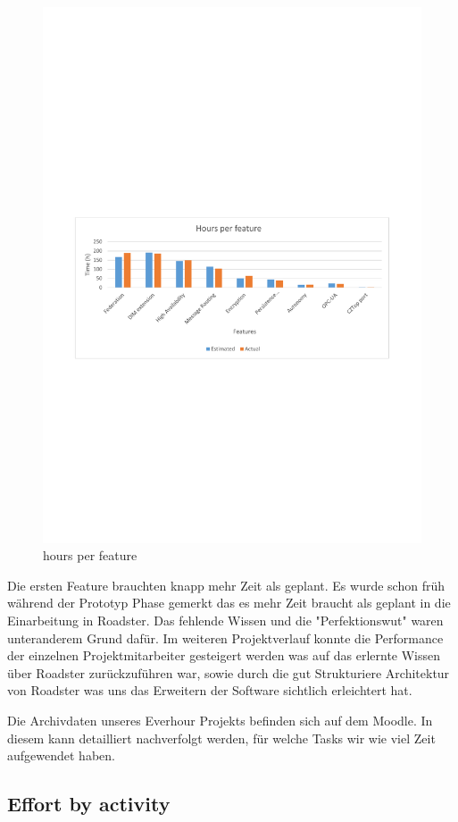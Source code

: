 
\begin{figure}[]
	\includegraphics[trim=2cm 10.5cm 2cm 11.9cm, clip=true, width=\textwidth]{img/project_monitoring_hours_per_feature_diagram.pdf}
	\caption{hours per feature}
	\label{fig:hours:per:feature}
\end{figure}

Die ersten Feature brauchten knapp mehr Zeit als geplant. Es wurde schon früh während der Prototyp Phase
gemerkt das es mehr Zeit braucht als geplant in die Einarbeitung in Roadster. Das fehlende Wissen und
die "Perfektionswut" waren unteranderem Grund dafür.
Im weiteren Projektverlauf konnte die Performance der einzelnen Projektmitarbeiter gesteigert werden
was auf das erlernte Wissen über Roadster zurückzuführen war, sowie durch die gut
Strukturiere Architektur von Roadster was uns das Erweitern der Software sichtlich erleichtert hat.


Die Archivdaten unseres Everhour Projekts befinden sich auf dem Moodle. 
In diesem kann detailliert nachverfolgt werden, 
für welche Tasks wir wie viel Zeit aufgewendet haben.

\subsection{Effort by activity}
